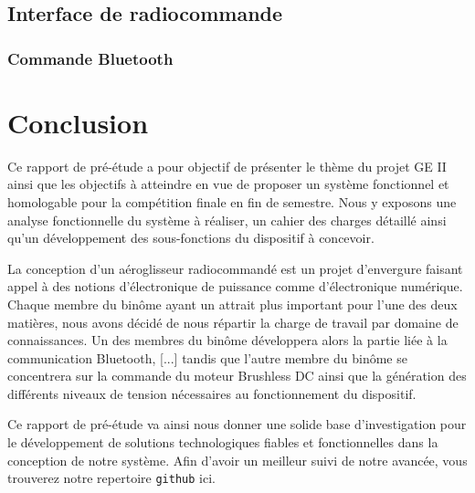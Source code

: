 \documentclass[a4paper,12pt]{report}
\begin{document}
		\subsection{Interface de radiocommande}
			
			\subsubsection{Commande Bluetooth}
	
	\section{Conclusion}
	
	Ce rapport de pré-étude a pour objectif de présenter le thème du projet GE II ainsi que les objectifs à atteindre en vue de proposer un système fonctionnel et homologable pour la compétition finale en fin de semestre. Nous y exposons une analyse fonctionnelle du système à réaliser, un cahier des charges détaillé ainsi qu'un développement des sous-fonctions du dispositif à concevoir.
	
	La conception d'un aéroglisseur radiocommandé est un projet d'envergure faisant appel à des notions d'électronique de puissance comme d'électronique numérique. Chaque membre du binôme ayant un attrait plus important pour l'une des deux matières, nous avons décidé de nous répartir la charge de travail par domaine de connaissances. Un des membres du binôme développera alors la partie liée à la communication Bluetooth, [...] tandis que l'autre membre du binôme se concentrera sur la commande du moteur Brushless DC ainsi que la génération des différents niveaux de tension nécessaires au fonctionnement du dispositif.
	
	Ce rapport de pré-étude va ainsi nous donner une solide base d'investigation pour le développement de solutions technologiques fiables et fonctionnelles dans la conception de notre système. Afin d'avoir un meilleur suivi de notre avancée, vous trouverez notre repertoire \texttt{github} ici.
	
\end{document}
